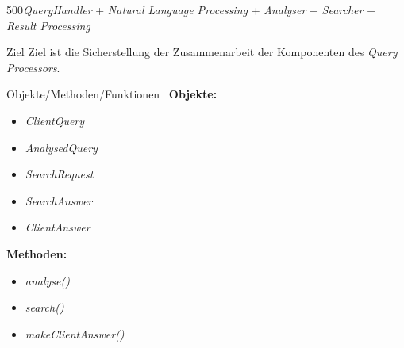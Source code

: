 \begin{testcase}{500}{\textit{QueryHandler} + \textit{Natural Language
Processing} +
\textit{Analyser} + \textit{Searcher} + \textit{Result Processing}}

\item[Ziel]
Ziel ist die Sicherstellung der Zusammenarbeit der Komponenten des \textit{Query Processors}.

\item[Objekte/Methoden/Funktionen]\
\textbf{Objekte: }
\begin{itemize}
\item \textit{ClientQuery}
\item \textit{AnalysedQuery}
\item \textit{SearchRequest}
\item \textit{SearchAnswer}
\item \textit{ClientAnswer}
\end{itemize}

\textbf{Methoden: }
\begin{itemize}
\item \textit{analyse()}
\item \textit{search()}
\item \textit{makeClientAnswer()}
\end{itemize}


\end{testcase}
